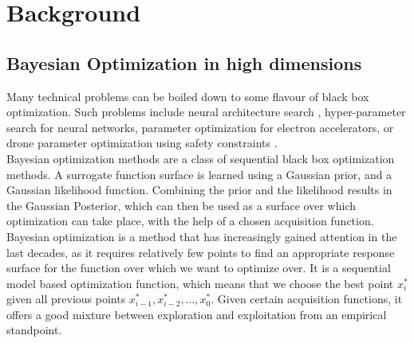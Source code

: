 
\chapter{Background}  %

\ifpdf
    \graphicspath{{Chapter1/Figs/Raster/}{Chapter1/Figs/PDF/}{Chapter1/Figs/}}
\else
    \graphicspath{{Chapter1/Figs/Vector/}{Chapter1/Figs/}}
\fi


\section{Bayesian Optimization in high dimensions} %

Many technical problems can be boiled down to some flavour of black box optimization. 
Such problems include neural architecture search \citep{BayesianOptimizationNAS}, hyper-parameter search for neural networks, parameter optimization for electron accelerators, or drone parameter optimization using safety constraints \citep{berkenkamp17saferl}. \\

Bayesian optimization methods are a class of sequential black box optimization methods.
A surrogate function surface is learned using a Gaussian prior, and a Gaussian likelihood function.
Combining the prior and the likelihood results in the Gaussian Posterior, which can then be used as a surface over which optimization can take place, with the help of a chosen acquisition function. \\

Bayesian optimization is a method that has increasingly gained attention in the last decades, as it requires relatively few points to find an appropriate response surface for the function over which we want to optimize over.
It is a sequential model based optimization function, which means that we choose the best point $x^*_i$ given all previous points $x^*_{i-1}, x^*_{i-2}, \ldots, x^*_{0}$.
Given certain acquisition functions, it offers a good mixture between exploration and exploitation from an empirical standpoint. \\

